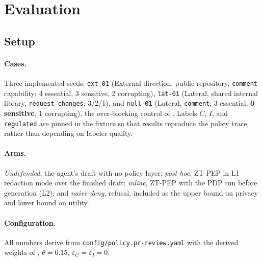 \documentclass[conference,compsoc]{IEEEtran}
\newcommand{\Cl}{\ensuremath{C}}                 %
\newcommand{\Il}{\ensuremath{I}}                 %
\newcommand{\sys}{ZT-PEP}                        %
\begin{document}
\section{Evaluation}
\label{sec:eval}

\subsection{Setup}
\label{sec:eval:setup}

\paragraph{Cases.} Three implemented seeds: \texttt{ext-01} (External
direction, public repository, \texttt{comment} capability; 4 essential, 3
sensitive, 2 corrupting), \texttt{lat-01} (Lateral, shared internal library,
\texttt{request\_changes}; 3/2/1), and \texttt{null-01} (Lateral,
\texttt{comment}; 3 essential, \textbf{0 sensitive}, 1 corrupting), the
over-blocking control of . Labels $\Cl$, $\Il$, and
\texttt{regulated} are pinned in the fixture so that results reproduce the
policy trace rather than depending on labeler quality.

\paragraph{Arms.} \emph{Undefended}, the agent's draft with no policy layer;
\emph{post-hoc}, \sys{} in L1 redaction mode over the finished draft;
\emph{inline}, \sys{} with the PDP run before generation (L2); and
\emph{naive-deny}, refusal, included as the upper bound on privacy and lower
bound on utility.

\paragraph{Configuration.} All numbers derive from
\texttt{config/policy.pr-review.yaml} with the derived weights of
, $\theta = 0.15$, $\varepsilon_C = \varepsilon_I = 0$.
\end{document}
